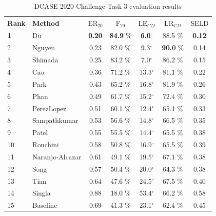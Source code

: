 \begin{table}[t]
\begin{footnotesize}
\caption{DCASE 2020 Challenge Task 3 evaluation results}
    \begin{center}	

\begin{tabular}{llccccc}
    \toprule
Rank       & Method  & $\text{ER}_{20}$ & $\text{F}_{20}$   & $\text{LE}_{CD}$ & $\text{LR}_{CD}$ & $\text{SELD}$ \\
    \midrule
\textbf{1} & Du & \textbf{0.20}  & \textbf{84.9} \%    & \textbf{6.0}$^{\circ}$   & 88.5 \%    &  \textbf{0.12 }    \\
2          & Nguyen          & 0.23  & 82.0 \%    & 9.3$^{\circ}$   &\textbf{ 90.0} \%    &  0.14     \\
3          & Shimada         & 0.25  & 83.2 \%    & 7.0$^{\circ}$   & 86.2 \%    &  0.15     \\
4          & Cao             & 0.36  & 71.2 \%    & 13.3$^{\circ}$  & 81.1 \%    &  0.22     \\
5          & Park            & 0.43  & 65.2 \%    & 16.8$^{\circ}$  & 81.9 \%    &  0.26     \\
6          & Phan            & 0.49  & 61.7 \%    & 15.2$^{\circ}$  & 72.4 \%    &  0.30     \\
7          & PerezLopez      & 0.51  & 60.1 \%    & 12.4$^{\circ}$  & 65.1 \%    &  0.33     \\
8          & Sampathkumar    & 0.53  & 56.6 \%    & 14.8$^{\circ}$  & 66.5 \%    &  0.35     \\
9          & Patel           & 0.55  & 55.5 \%    & 14.4$^{\circ}$  & 65.5 \%    &  0.38     \\
10         & Ronchini        & 0.58  & 50.8 \%    & 16.9$^{\circ}$  & 65.5 \%    &  0.39     \\
11         & Naranjo-Alcazar & 0.61  & 49.1 \%    & 19.5$^{\circ}$  & 67.1 \%    &  0.38     \\
12         & Song            & 0.57  & 50.4 \%    & 20.0$^{\circ}$  & 64.3 \%    &  0.38     \\
13         & Tian            & 0.64  & 47.6 \%    & 24.5$^{\circ}$  & 67.5 \%    &  0.40     \\
14         & Singla          & 0.88  & 18.0 \%    & 53.4$^{\circ}$  & 66.2 \%    &  0.58     \\
15         & Baseline        & 0.69  & 41.3 \%    & 23.1$^{\circ}$  & 62.4 \%    &  0.45     \\
\bottomrule      
\end{tabular}
\end{center}
    \label{tab:dcase2020results}
    \end{footnotesize}
\end{table}

